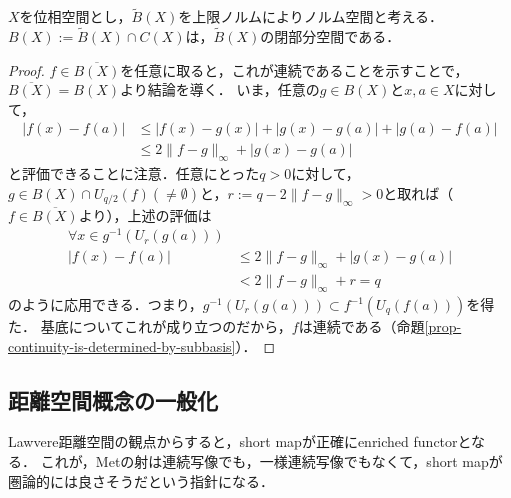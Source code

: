 \documentclass[uplatex,dvipdfmx]{jsreport}
\begin{document}
\begin{proposition}\label{prop-有界連続関数のなす部分空間は，一様収束位相に関して閉集合である}
    $X$を位相空間とし，$\widetilde{B}(X)$を上限ノルムによりノルム空間と考える．
    $B(X):=\widetilde{B}(X)\cap C(X)$は，$\widetilde{B}(X)$の閉部分空間である．
\end{proposition}
\begin{proof}
    $f\in\overline{B(X)}$を任意に取ると，これが連続であることを示すことで，$\overline{B(X)}=B(X)$より結論を導く．
    いま，任意の$g\in B(X)$と$x,a\in X$に対して，
    \begin{align*}
        |f(x)-f(a)|&\le |f(x)-g(x)|+|g(x)-g(a)|+|g(a)-f(a)|\\
        &\le 2\|f-g\|_\infty+|g(x)-g(a)|
    \end{align*}
    と評価できることに注意．任意にとった$q>0$に対して，$g\in B(X)\cap U_{q/2}(f)(\ne\emptyset)$と，$r:=q-2\|f-g\|_\infty>0$と取れば（$f\in\overline{B(X)}$より），上述の評価は
    \begin{align*}
        \forall x\in g^{-1}(U_r(g(a)))&\\
        |f(x)-f(a)|&\le 2\|f-g\|_\infty+|g(x)-g(a)|\\
        &<2\|f-g\|_\infty+r=q
    \end{align*}
    のように応用できる．つまり，$g^{-1}(U_r(g(a)))\subset f^{-1}(U_q(f(a)))$を得た．
    基底についてこれが成り立つのだから，$f$は連続である（命題\ref{prop-continuity-is-determined-by-subbasis}）．
\end{proof}

\subsection{距離空間概念の一般化}

\begin{tcolorbox}[colframe=ForestGreen, colback=ForestGreen!10!white,breakable,colbacktitle=ForestGreen!40!white,coltitle=black,fonttitle=\bfseries\sffamily,
title=]
    Lawvere距離空間の観点からすると，short mapが正確にenriched functorとなる．
    これが，Metの射は連続写像でも，一様連続写像でもなくて，short mapが圏論的には良さそうだという指針になる．
\end{tcolorbox}
\end{document}
